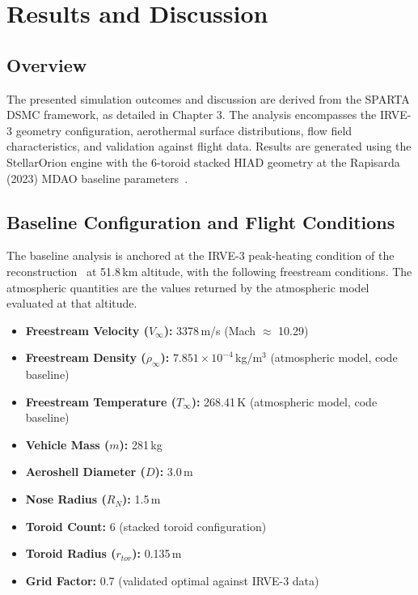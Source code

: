 \chapter{Results and Discussion}
\label{ch:results}

\section{Overview}
The presented simulation outcomes and discussion are derived from the SPARTA DSMC framework, as detailed in Chapter 3. The analysis encompasses the IRVE-3 geometry configuration, aerothermal surface distributions, flow field characteristics, and validation against flight data. Results are generated using the StellarOrion engine with the 6-toroid stacked HIAD geometry at the Rapisarda (2023) MDAO baseline parameters~\cite{rapisarda2023mdao}.

\section{Baseline Configuration and Flight Conditions}
The baseline analysis is anchored at the IRVE-3 peak-heating condition of the reconstruction~\cite{rapisarda2023mdao} at 51.8\,km altitude, with the following freestream conditions. The atmospheric quantities are the values returned by the atmospheric model evaluated at that altitude.
\begin{itemize}
    \item \textbf{Freestream Velocity ($V_{\infty}$):} 3378\,m/s (Mach $\approx$ 10.29)

    \item \textbf{Freestream Density ($\rho_{\infty}$):} $7.851 \times 10^{-4}$\,kg/m$^3$ (atmospheric model, code baseline)

    \item \textbf{Freestream Temperature ($T_{\infty}$):} 268.41\,K (atmospheric model, code baseline)

    \item \textbf{Vehicle Mass ($m$):} 281\,kg

    \item \textbf{Aeroshell Diameter ($D$):} 3.0\,m

    \item \textbf{Nose Radius ($R_N$):} 1.5\,m

    \item \textbf{Toroid Count:} 6 (stacked toroid configuration)

    \item \textbf{Toroid Radius ($r_{tor}$):} 0.135\,m

    \item \textbf{Grid Factor:} 0.7 (validated optimal against IRVE-3 data)
\end{itemize}

